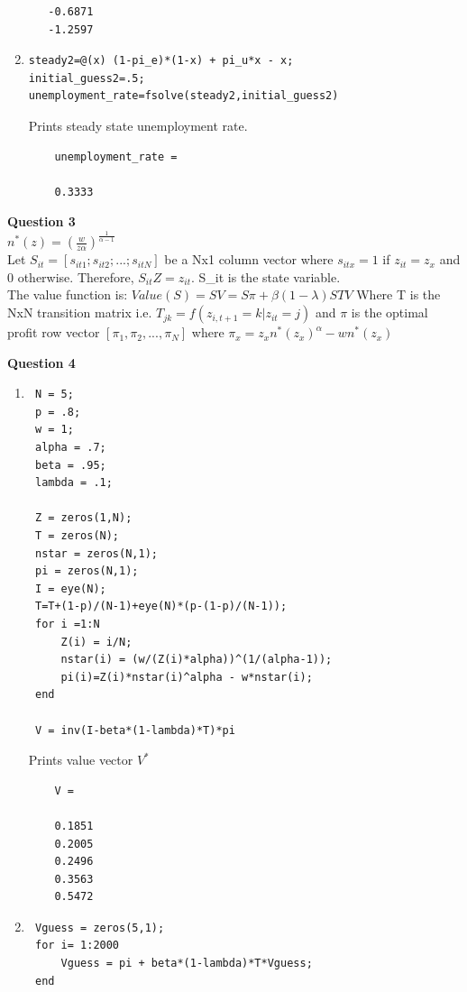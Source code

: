 \documentclass[12pt]{article}
\begin{document}
\begin{onehalfspace}
\begin{enumerate}[1.]
\begin{lstlisting}
   -0.6871
   -1.2597
	\end{lstlisting}
	
	\item
	\begin{lstlisting}
steady2=@(x) (1-pi_e)*(1-x) + pi_u*x - x;
initial_guess2=.5;
unemployment_rate=fsolve(steady2,initial_guess2)
	\end{lstlisting}
	Prints steady state unemployment rate.
	\begin{lstlisting}
	unemployment_rate =

    0.3333
	\end{lstlisting}
\end{enumerate}

\textbf{Question 3}\\

$n^*(z) = (\frac{w}{z\alpha})^{\frac{1}{\alpha-1}}$\\
 
 Let $S_{it} = [s_{it1}; s_{it2}; ... ; s_{itN}]$ be a Nx1 column vector where $s_{itx}=1$ if $z_{it} = z_x$ and 0 otherwise. Therefore, $S_{it}Z = z_{it}$. S_it is the state variable.\\
 The value function is: $Value(S) = SV = S\pi + \beta(1-\lambda)STV$
 Where T is the NxN transition matrix i.e. $T_{jk} = f(z_{i,t+1} = k | z_{it} = j)$ and $\pi$ is the optimal profit row vector $[\pi_1, \pi_2, ... , \pi_N]$ where $\pi_x = z_xn^*(z_x)^\alpha - wn^*(z_x)$
 
\textbf{Question 4}\\

\begin{enumerate}[1.]
	\item
	\begin{lstlisting}
 N = 5;
 p = .8;
 w = 1;
 alpha = .7;
 beta = .95;
 lambda = .1;
 
 Z = zeros(1,N);
 T = zeros(N);
 nstar = zeros(N,1);
 pi = zeros(N,1);
 I = eye(N);
 T=T+(1-p)/(N-1)+eye(N)*(p-(1-p)/(N-1));
 for i =1:N
     Z(i) = i/N;
     nstar(i) = (w/(Z(i)*alpha))^(1/(alpha-1));
     pi(i)=Z(i)*nstar(i)^alpha - w*nstar(i);
 end
 
 V = inv(I-beta*(1-lambda)*T)*pi
	\end{lstlisting}
	Prints value vector $V^*$
	\begin{lstlisting}
	V =

    0.1851
    0.2005
    0.2496
    0.3563
    0.5472
	\end{lstlisting}
	
	\item
	\begin{lstlisting}
 Vguess = zeros(5,1);
 for i= 1:2000
     Vguess = pi + beta*(1-lambda)*T*Vguess;
 end


\end{lstlisting}
\end{enumerate}
\end{onehalfspace}
\end{document}
